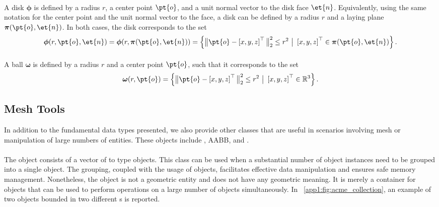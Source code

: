 \paragraph{\Disk{}}
A disk $\boldsymbol{\phi}$ is defined by a radius $r$, a center point $\pt{o}$, and a unit normal vector to the disk face $\et{n}$. Equivalently, using the same notation for the center point and the unit normal vector to the face, a disk can be defined by a radius $r$ and a laying plane $\boldsymbol{\pi}(\pt{o}, \et{n})$. In both cases, the disk corresponds to the set
%
\begin{equation*}
  \boldsymbol{\phi}(r, \pt{o}, \et{n}) = \boldsymbol{\phi}(r, \boldsymbol{\pi}(\pt{o}, \et{n})) = \left\{ \big\| \pt{o} - \left[x, y, z\right]^{\top} \big\|^2_2 \le r^2 ~ \big| ~ \left[x, y, z\right]^{\top} \in \boldsymbol{\pi}(\pt{o}, \et{n}) \right\} \text{.}
\end{equation*}

\paragraph{\Ball{}}
A ball $\boldsymbol{\omega}$ is defined by a radius $r$ and a center point $\pt{o}$, such that it corresponds to the set
%
\begin{equation*}
  \boldsymbol{\omega}(r, \pt{o}) = \left\{ \big\| \pt{o} - \left[x, y, z\right]^{\top} \big\|^2_2 \le r^2 ~ \big| ~\left[x, y, z\right]^{\top} \in \mathbb{R}^3 \right\} \text{.}
\end{equation*}

\subsection{Mesh Tools}
In addition to the fundamental data types presented, we also provide other classes that are useful in scenarios involving mesh or manipulation of large numbers of entities. These objects include \Collection{}, \ac{AABB}, and \AabbTree{}.

\paragraph{\Collection{}}
The \Collection{} object consists of a vector of \SharedPointer{} to \Entity{} type objects. This class can be used when a substantial number of \Entity{} object instances need to be grouped into a single object. The grouping, coupled with the usage of \SharedPointer{} objects, facilitates effective data manipulation and ensures safe memory management. Nonetheless, the \Collection{} object is not a geometric entity and does not have any geometric meaning. It is merely a container for \Entity{} objects that can be used to perform operations on a large number of \Entity{} objects simultaneously. In \figurename{}~\ref{app1:fig:acme_collection}, an example of two \Collection{} objects bounded in two different \Aabb{}s is reported.

